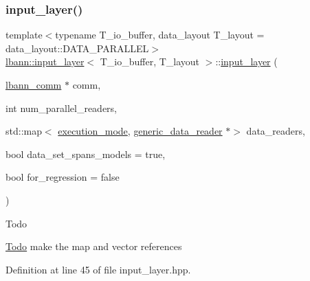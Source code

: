 \subsubsection{\texorpdfstring{input\+\_\+layer()}{input\_layer()}\hspace{0.1cm}{\footnotesize\ttfamily [1/2]}}
{\footnotesize\ttfamily template$<$typename T\+\_\+io\+\_\+buffer, data\+\_\+layout T\+\_\+layout = data\+\_\+layout\+::\+D\+A\+T\+A\+\_\+\+P\+A\+R\+A\+L\+L\+EL$>$ \\
\hyperlink{classlbann_1_1input__layer}{lbann\+::input\+\_\+layer}$<$ T\+\_\+io\+\_\+buffer, T\+\_\+layout $>$\+::\hyperlink{classlbann_1_1input__layer}{input\+\_\+layer} (\begin{DoxyParamCaption}\item[{\hyperlink{classlbann_1_1lbann__comm}{lbann\+\_\+comm} $\ast$}]{comm,  }\item[{int}]{num\+\_\+parallel\+\_\+readers,  }\item[{std\+::map$<$ \hyperlink{base_8hpp_a2781a159088df64ed7d47cc91c4dc0a8}{execution\+\_\+mode}, \hyperlink{classlbann_1_1generic__data__reader}{generic\+\_\+data\+\_\+reader} $\ast$$>$}]{data\+\_\+readers,  }\item[{bool}]{data\+\_\+set\+\_\+spans\+\_\+models = {\ttfamily true},  }\item[{bool}]{for\+\_\+regression = {\ttfamily false} }\end{DoxyParamCaption})\hspace{0.3cm}{\ttfamily [inline]}}

\begin{DoxyRefDesc}{Todo}
\item[\hyperlink{todo__todo000021}{Todo}]make the map and vector references \end{DoxyRefDesc}


Definition at line 45 of file input\+\_\+layer.\+hpp.


